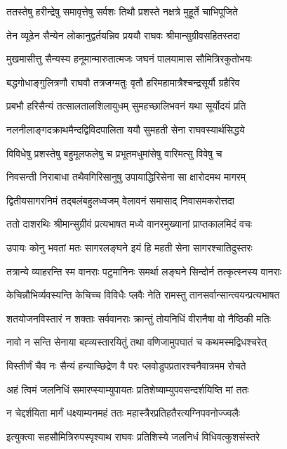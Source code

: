 \twolineshloka
{ततस्तेषु हरीन्द्रेषु समावृत्तेषु सर्वशः}
{तिथौ प्रशस्ते नक्षत्रे मुहूर्ते चाभिपूजिते}


\twolineshloka
{तेन व्यूढेन सैन्येन लोकानुद्वर्तयन्निव}
{प्रययौ राघवः श्रीमान्सुग्रीवसहितस्तदा}


\twolineshloka
{मुखमासीत्तु सैन्यस्य हनूमान्मारुतात्मजः}
{जघनं पालयामास सौमित्रिरकुतोभयः}


\twolineshloka
{बद्धगोधाङ्गुलित्रणौ राघवौ तत्रजग्मतुः}
{वृतौ हरिमहामात्रैश्चन्द्रसूर्यौ ग्रहैरिव}


\twolineshloka
{प्रबभौ हरिसैन्यं तत्सालतालशिलायुधम्}
{सुमहच्छालिभवनं यथा सूर्योदयं प्रति}


\twolineshloka
{नलनीलाङ्गदक्राथमैन्दद्विविदपालिता}
{ययौ सुमहती सेना राघवस्यार्थसिद्धये}


\twolineshloka
{विविधेषु प्रशस्तेषु बहुमूलफलेषु च}
{प्रभूतमधुमांसेषु वारिमत्सु विवेषु च}


\twolineshloka
{निवसन्ती निराबाधा तथैवगिरिसानुषु}
{उपायाद्धिरिसेना सा क्षारोदमथ मागरम्}


\twolineshloka
{द्वितीयसागरनिमं तद्बलंबहुलध्वजम्}
{वेलावनं समासाद् निवासमकरोत्तदा}


\twolineshloka
{ततो दाशरथिः श्रीमान्सुग्रीवं प्रत्यभाषत}
{मध्ये वानरमुख्यानां प्राप्तकालमिदं वचः}


\twolineshloka
{उपायः कोनु भवतां मतः सागरलङ्घने}
{इयं हि महती सेना सागरश्चातिदुस्तरः}


\twolineshloka
{तत्रान्ये व्याहरन्ति स्म वानराः पटुमानिनः}
{समर्था लङ्घने सिन्दोर्न तत्कृत्स्नस्य वानराः}


\twolineshloka
{केचिन्नौभिर्व्यवस्यन्ति केचिच्च विविधैः प्लवैः}
{नेति रामस्तु तानसर्वान्सान्त्वयन्प्रत्यभाषत}


\twolineshloka
{शतयोजनविस्तारं न शक्ताः सर्ववानराः}
{क्रान्तुं तोयनिधिं वीरानैषा वो नैष्ठिकी मतिः}


\twolineshloka
{नावो न सन्ति सेनाया बह्व्यस्तारयितुं तथा}
{वणिजामुपघातं च कथमस्मद्विधश्चरेत्}


\twolineshloka
{विस्तीर्णं चैव नः सैन्यं हन्याच्छिद्रेण वै परः}
{प्लवोडुपप्रतारश्चनैवात्रमम रोचते}


\twolineshloka
{अहं त्विमं जलनिधिं समारप्स्याम्युपायतः}
{प्रतिशेष्याम्युपवसन्दर्शयिष्ति मां ततः}


\twolineshloka
{न चेद्दर्शयिता मार्गं धक्ष्याम्यनमहं ततः}
{महास्त्रैरप्रतिहतैरत्यग्निपवनोज्ज्वलैः}


\twolineshloka
{इत्युक्त्वा सहसौमित्रिरुपस्पृश्याथ राघवः}
{प्रतिशिस्ये जलनिधं विधिवत्कुशसंस्तरे}


